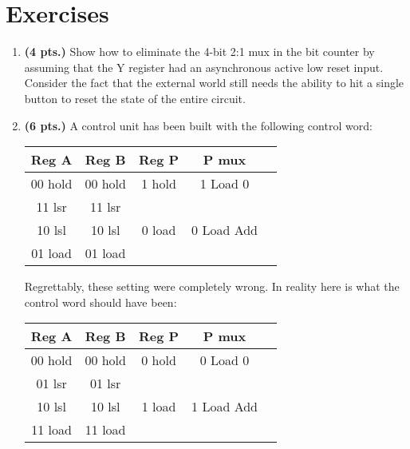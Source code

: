 \section{Exercises}
\label{section:datapathControl}
\graphicspath{ {./chapter08/FigHw} }

\begin{enumerate}
    \item \textbf{ (4 pts.)}
        Show how to eliminate the 4-bit 2:1 mux in the bit counter by
        assuming that the Y register had an asynchronous active low reset input.
        Consider the fact that the external world still needs the ability to hit
        a single button to reset the state of the entire circuit.

    \item  \textbf{ (6 pts.)}
        A control unit has been built with the following control word:

        \begin{tabular}{|c|c|c|c|c|}  \hline
            Reg A       & Reg B         &  Reg P        & P mux         \\ \hline
            00 hold     & 00 hold       &  1 hold       & 1 Load 0      \\ \hline
            11 lsr      & 11 lsr        &               &               \\ \hline
            10 lsl      & 10 lsl        &  0 load       & 0 Load Add    \\ \hline
            01 load     & 01 load       &               &               \\ \hline
        \end{tabular}

        Regrettably, these setting were completely wrong.  In reality here is what the control word should
        have been:

        \begin{tabular}{|c|c|c|c|c|}  \hline
            Reg A       & Reg B         &  Reg P        & P mux         \\ \hline
            00 hold     & 00 hold       &  0 hold       & 0 Load 0      \\ \hline
            01 lsr      & 01 lsr        &               &               \\ \hline
            10 lsl      & 10 lsl        &  1 load       & 1 Load Add    \\ \hline
            11 load     & 11 load       &               &               \\ \hline
        \end{tabular}


\end{enumerate}
